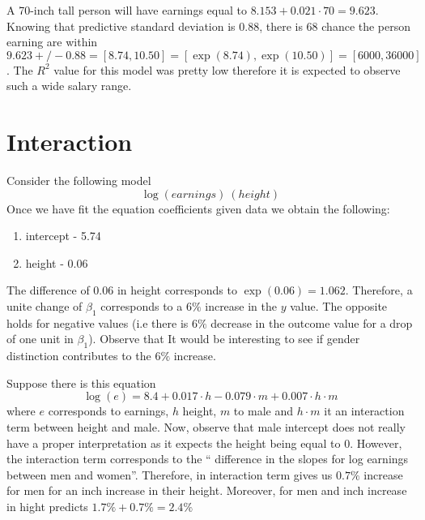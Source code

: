\documentclass{article}
\begin{document}
A 70-inch tall person will have earnings equal to $8.153 + 0.021 \cdot 70 = 9.623$. Knowing that predictive standard deviation is $0.88$, there is $68$ chance the person earning are within $9.623 +/- 0.88= [8.74, 10.50]= [\exp(8.74), \exp(10.50)] = [6000, 36000]$. The $R^2$ value for this model was pretty low therefore it is expected to observe such a wide salary range.
\section{Interaction}

Consider the following model
\begin{equation}
\log( earnings ) ~ (height)
\end{equation}
Once we have fit the equation coefficients given data we obtain the following:
\begin{enumerate}
\item intercept - 5.74
\item height - 0.06
\end{enumerate}
The difference of $0.06$ in height corresponds to $\exp(0.06)=1.062$. Therefore, a unite change of $\beta_1$ corresponds to a $6\%$ increase in the $y$ value. The opposite holds for negative values (i.e there is $6\%$ decrease in the outcome value for a drop of one unit in $\beta_1$). Observe that It would be interesting to see if gender distinction contributes to the $6\%$ increase.

Suppose there is this equation
\begin{equation}
\log(e) = 8.4+0.017 \cdot h - 0.079 \cdot m + 0.007 \cdot h \cdot m 
\end{equation}
where $e$ corresponds to earnings, $h$ height, $m$ to male and $h \cdot m $ it an interaction term between height and male. Now, observe that male intercept does not really have a proper interpretation as it expects the height being equal to 0. However, the interaction term corresponds to the `` difference in the slopes for log earnings between men and women''. Therefore, in interaction term gives us $0.7\%$ increase for men for an inch increase in their height. Moreover, for men and inch increase in hight predicts $1.7\% + 0.7\% = 2.4\%$
\end{document}
